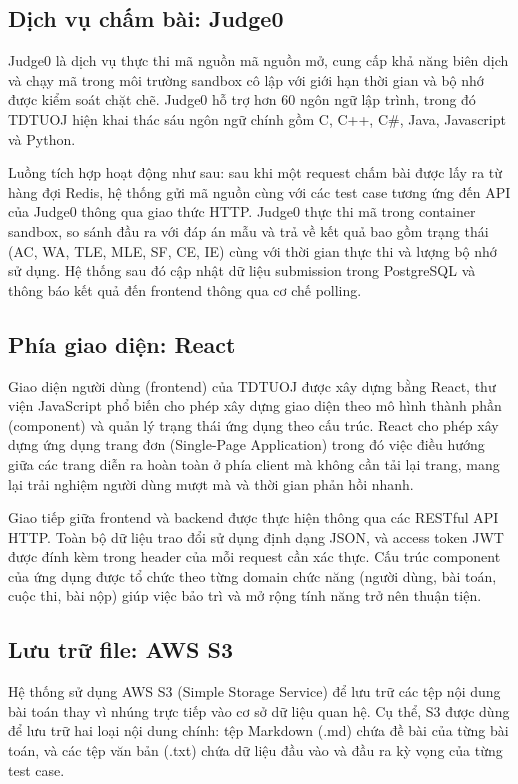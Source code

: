 \documentclass[12pt, a4paper]{report}
\begin{document}
\subsection{Dịch vụ chấm bài: Judge0}

Judge0 là dịch vụ thực thi mã nguồn mã nguồn mở, cung cấp khả năng biên dịch và chạy mã
trong môi trường sandbox cô lập với giới hạn thời gian và bộ nhớ được kiểm soát chặt chẽ.
Judge0 hỗ trợ hơn 60 ngôn ngữ lập trình, trong đó TDTUOJ hiện khai thác sáu ngôn ngữ chính
gồm C, C++, C\#, Java, Javascript và Python.

Luồng tích hợp hoạt động như sau: sau khi một request chấm bài được lấy ra từ hàng đợi
Redis, hệ thống gửi mã nguồn cùng với các test case tương ứng đến \ac{API} của Judge0
thông qua giao thức \ac{HTTP}. Judge0 thực thi mã trong container sandbox, so sánh đầu ra
với đáp án mẫu và trả về kết quả bao gồm trạng thái (\ac{AC}, \ac{WA}, \ac{TLE}, \ac{MLE},
\ac{SF}, \ac{CE}, \ac{IE}) cùng với thời gian thực thi và lượng bộ nhớ sử dụng. Hệ thống sau đó cập
nhật dữ liệu submission trong PostgreSQL và thông báo kết quả đến frontend thông qua cơ
chế polling.

\subsection{Phía giao diện: React}

Giao diện người dùng (frontend) của TDTUOJ được xây dựng bằng React, thư viện JavaScript
phổ biến cho phép xây dựng giao diện theo mô hình thành phần (component) và quản lý trạng
thái ứng dụng theo cấu trúc. React cho phép xây dựng ứng dụng trang đơn
(Single-Page Application) trong đó việc điều hướng giữa các trang diễn ra hoàn toàn ở phía
client mà không cần tải lại trang, mang lại trải nghiệm người dùng mượt mà và thời gian phản hồi
nhanh.

Giao tiếp giữa frontend và backend được thực hiện thông qua các \ac{REST}ful \ac{API}
\ac{HTTP}. Toàn bộ dữ liệu trao đổi sử dụng định dạng \ac{JSON}, và access token \ac{JWT}
được đính kèm trong header của mỗi request cần xác thực. Cấu trúc component của ứng dụng
được tổ chức theo từng domain chức năng (người dùng, bài toán, cuộc thi, bài nộp) giúp
việc bảo trì và mở rộng tính năng trở nên thuận tiện.

\subsection{Lưu trữ file: AWS S3}

Hệ thống sử dụng AWS S3 (Simple Storage Service) để lưu trữ các tệp nội dung bài toán thay
vì nhúng trực tiếp vào cơ sở dữ liệu quan hệ. Cụ thể, S3 được dùng để lưu trữ hai loại nội
dung chính: tệp Markdown (.md) chứa đề bài của từng bài toán, và các tệp văn bản
(.txt) chứa dữ liệu đầu vào và đầu ra kỳ vọng của từng test case.
\end{document}
